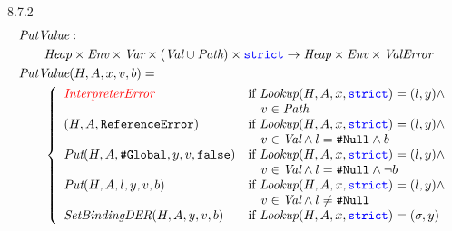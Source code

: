 \documentclass[a4paper]{article}
\newcommand{\code}[1]{\textcolor{blue}{\tt #1}}
\newcommand{\If}{\mbox{if}}
\begin{document}
8.7.2
\begin{equation*}
\begin{split}
& \emph{PutValue} : \\
&\qquad \emph{Heap} \times \emph{Env} \times \emph{Var} \times (\emph{Val} \cup \emph{Path}) \times \code{strict} \rightarrow \emph{Heap} \times \emph{Env} \times \emph{ValError} \\
& \emph{PutValue} (H, A, x, v, b) = \\
&\qquad \left\{\begin{array}{ll}
\textcolor{red}{\emph{InterpreterError}} & \If\ \emph{Lookup} (H, A, x, \code{strict}) = (l, y) \wedge \\
&\quad v \in \emph{Path} \\
(H, A, \texttt{ReferenceError}) & \If\ \emph{Lookup} (H, A, x, \code{strict}) = (l, y) \wedge \\
&\quad v \in \emph{Val} \wedge l = \texttt{\#Null} \wedge b \\
\emph{Put} (H, A, \texttt{\#Global}, y, v, \texttt{false}) & \If\ \emph{Lookup} (H, A, x, \code{strict}) = (l, y) \wedge \\
&\quad v \in \emph{Val} \wedge l = \texttt{\#Null} \wedge \neg b \\
\emph{Put} (H, A, l, y, v, b) & \If\ \emph{Lookup} (H, A, x, \code{strict}) = (l, y) \wedge \\
&\quad v \in \emph{Val} \wedge l \ne \texttt{\#Null} \\
\emph{SetBindingDER} (H, A, y, v, b) & \If\ \emph{Lookup} (H, A, x, \code{strict}) = (\sigma, y) \\
\end{array}\right.
\end{split}
\end{equation*}
\end{document}
